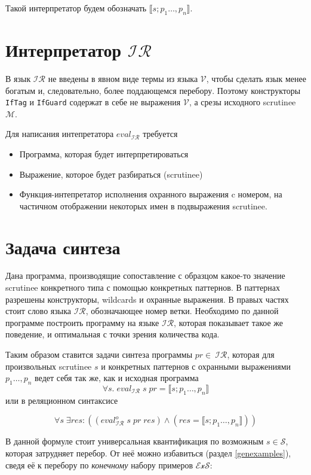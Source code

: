 \documentclass[a5paper,12pt]{article}
\newcommand{\sem}[1]{\llbracket #1 \rrbracket}
\newcommand{\ir}{\ensuremath{\mathcal{I\!R}}}
\begin{document}
Такой интерпретатор будем обозначать $\sem{s;p_1\dots,p_n}$.



\section{Интерпретатор $\ir$}
В язык $\ir$ не введены в явном виде термы из языка $\mathcal{V}$, чтобы сделать язык менее богатым и, следовательно, более поддающемся перебору. Поэтому конструкторы \texttt{IfTag} и \texttt{IfGuard} содержат в себе не выражения $\mathcal{V}$, а срезы исходного scrutinee $\mathcal{M}$.

Для написания интепретатора $eval_{\ir}$ требуется 
\begin{itemize}
\item Программа, которая будет интерпретироваться
\item Выражение, которое будет разбираться (scrutinee)
\item Функция-интепретатор исполнения охранного выражения c номером, на частичном отображении некоторых имен в подвыражения scrutinee.
\end{itemize}

\section{Задача синтеза}

Дана программа, производящие сопоставление с образцом какое-то значение 
scrutinee конкретного типа с помощью конкретных паттернов. В паттернах разрешены конструкторы, wildcards и охранные выражения. В правых частях стоит слово языка $\ir$, обозначающее номер ветки. Необходимо по данной программе построить программу на языке $\ir$, которая показывает такое же поведение, и оптимальная с точки зрения количества кода.

Таким образом ставится задачи синтеза программы $pr\in~\ir$, которая для произвольных scrutinee $s$  и конкретных паттернов с охранными выражениями $p_1\dots,p_n$ ведет себя так же, как и исходная программа
$$
\forall s.\; eval_{\ir}\; s\; pr = \sem{s;p_1\dots,p_n}
$$
или в реляционном синтаксисе

$$
\forall s\; \exists res: \left((eval^o_{\ir}\; s \; pr \; res) \land ( res = \sem{s;p_1\dots,p_n}) \right)
$$

В данной формуле стоит универсальная квантификация по возможным $s\in\mathcal{S}$, которая затрудняет перебор. От неё можно избавиться (раздел \ref{genexamples}), сведя её к перебору по \emph{конечному} набору примеров $\mathcal{ExS}$:
\end{document}
